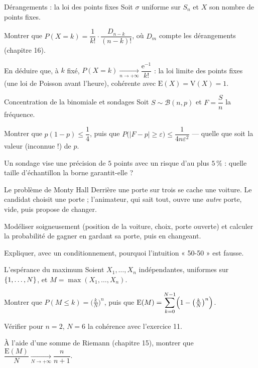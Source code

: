 
\begin{exercice}[3]{Dérangements : la loi des points fixes}
Soit $\sigma$ uniforme sur $S_n$ et $X$ son nombre de points fixes.
\begin{questions}
  \item Montrer que $P(X=k)=\dfrac{1}{k!}\cdot\dfrac{D_{n-k}}{(n-k)!}$,
    où $D_m$ compte les dérangements (chapitre 16).
  \item En déduire que, à $k$ fixé,
    $P(X=k)\xrightarrow[n\to+\infty]{}\dfrac{\mathrm{e}^{-1}}{k!}$ :
    la loi limite des points fixes (une loi de Poisson avant l'heure),
    cohérente avec $\mathrm{E}(X)=\mathrm{V}(X)=1$.
\end{questions}
\end{exercice}

\begin{exercice}[3]{Concentration de la binomiale et sondages}
Soit $S\sim\mathcal{B}(n,p)$ et $F=\dfrac Sn$ la fréquence.
\begin{questions}
  \item Montrer que $p(1-p)\leqslant\dfrac14$, puis que
    $P\bigl(|F-p|\geqslant\varepsilon\bigr)
    \leqslant\dfrac{1}{4n\varepsilon^{2}}$ — quelle que soit la valeur
    (inconnue !) de $p$.
  \item Un sondage vise une précision de $5$ points avec un risque d'au
    plus $5\,\%$ : quelle taille d'échantillon la borne garantit-elle ?
\end{questions}
\end{exercice}

\begin{exercice}[3]{Le problème de Monty Hall}
Derrière une porte sur trois se cache une voiture. Le candidat choisit une
porte ; l'animateur, qui sait tout, ouvre une \emph{autre} porte, vide,
puis propose de changer.
\begin{questions}
  \item Modéliser soigneusement (position de la voiture, choix, porte
    ouverte) et calculer la probabilité de gagner en gardant sa porte,
    puis en changeant.
  \item Expliquer, avec un conditionnement, pourquoi l'intuition
    « 50-50 » est fausse.
\end{questions}
\end{exercice}

\begin{exercice}[3]{L'espérance du maximum}
Soient $X_1,\dots,X_n$ indépendantes, uniformes sur $\left\{1,\dots,N\right\}$, et
$M=\max(X_1,\dots,X_n)$.
\begin{questions}
  \item Montrer que $P(M\leqslant k)=\bigl(\tfrac kN\bigr)^{n}$, puis que
    $\mathrm{E}(M)=\displaystyle\sum_{k=0}^{N-1}
    \Bigl(1-\bigl(\tfrac kN\bigr)^{n}\Bigr)$.
  \item Vérifier pour $n=2$, $N=6$ la cohérence avec l'exercice 11.
  \item À l'aide d'une somme de Riemann (chapitre 15), montrer que
    $\dfrac{\mathrm{E}(M)}{N}\xrightarrow[N\to+\infty]{}\dfrac{n}{n+1}$.
\end{questions}
\end{exercice}

